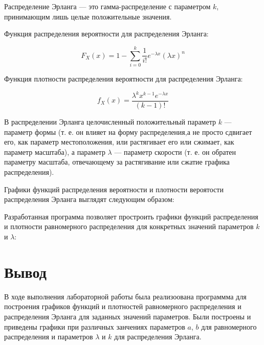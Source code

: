 Распределение Эрланга --- это гамма-распределение  с параметром $k$, принимающим лишь целые положительные значения. 

Функция распределения вероятности для распределения Эрланга:

\begin{equation*}
F_X(x) = 1 - \sum_{i=0}^k  \frac{1}{i!} e^{-\lambda x} (\lambda x)^n
\end{equation*}
	
Функция плотности распределения вероятности для распределения Эрланга:

\begin{equation*}
f_X(x) = \frac{\lambda^k x^{k-1} e^{-\lambda x} } {(k-1)!}
\end{equation*}

В распределении Эрланга целочисленный положительный параметр $k$ 	--- параметр формы (т. е. он влияет на форму распределения,а не просто сдвигает его, как параметр местоположения, или растягивает его или сжимает, как параметр масштаба), а параметр $\lambda$ --- параметр скорости (т. е. он обратен параметру масштаба, отвечающему за растягивание или сжатие графика распределения). 

Графики функций распределения вероятности и плотности вероятости распределения Эрланга выглядят следующим образом:



Разработанная программа позволяет простроить графики функций распределения и плотности равномерного распределения для конкретных значений параметров $k$ и $\lambda$:


\section*{Вывод}

В ходе выполнения лабораторной работы была реализоована программма для построения графиков функций и плотностей равномерного распределения и распределения Эрланга для заданных значений параметров.
Были построены и приведены графики при различных занчениях параметров $a$, $b$ для равномерного распределения и параметров $\lambda$ и $k$ для распределения Эрланга.
